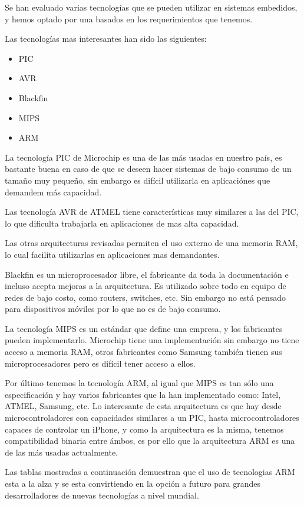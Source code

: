 Se han evaluado varias tecnolog\'ias que se pueden utilizar en sistemas embedidos, y hemos optado por una basados en los requerimientos que tenemos.

Las tecnolog\'ias mas interesantes han sido las siguientes:

\begin{itemize}
\item PIC
\item AVR
\item Blackfin
\item MIPS
\item ARM
\end{itemize}

La tecnolog\'ia PIC de Microchip es una de las m\'as usadas en nuestro pa\'is, es bastante buena en caso de que se deseen hacer sistemas de bajo consumo de un tama\~no muy peque\~no, sin embargo es dif\'icil utilizarla en aplicaci\'ones que demandem m\'as capacidad.

Las tecnolog\'ia AVR de ATMEL tiene caracter\'isticas muy similares a las del PIC, lo que dificulta trabajarla en aplicaciones de mas alta capacidad.

Las otras arquitecturas revisadas permiten el uso externo de una memoria RAM, lo cual facilita utilizarlas en aplicaciones mas demandantes.

Blackfin es un microprocesador libre, el fabricante da toda la documentaci\'on e incluso acepta mejoras a la arquitectura. Es utilizado sobre todo en equipo de redes de bajo costo, como routers, switches, etc. Sin embargo no est\'a pensado para dispositivos m\'oviles por lo que no es de bajo consumo. 

La tecnolog\'ia MIPS es un est\'andar que define una empresa, y los fabricantes pueden implementarlo. Microchip tiene una implementaci\'on sin embargo no tiene acceso a memoria RAM, otros fabricantes como Samsung tambi\'en tienen sus microprocesadores pero es dif\'icil tener acceso a ellos.

Por \'ultimo tenemos la tecnolog\'ia ARM, al igual que MIPS es tan s\'olo una especificaci\'on y hay varios fabricantes que la han implementado como: Intel, ATMEL, Samsung, etc. Lo interesante de esta arquitectura es que hay desde microcontroladores con capacidades similares a un PIC, hasta microcontroladores capaces de controlar un iPhone, y como la arquitectura es la misma, tenemos compatibilidad binaria entre \'ambos, es por ello que la arquitectura ARM es una de las m\'as usadas actualmente.

Las tablas mostradas a continuación demuestran que el uso de tecnologias ARM esta a la alza y se esta convirtiendo en la opción a futuro para grandes desarrolladores de nuevas tecnolog\'ias a nivel mundial.

